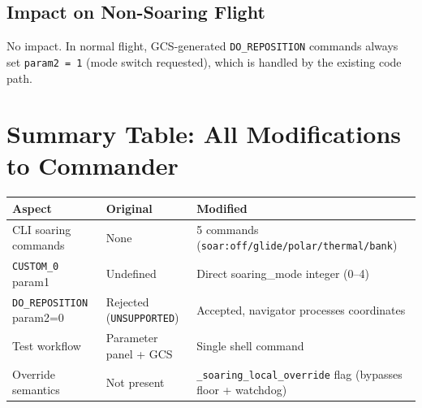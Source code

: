 \documentclass[12pt,a4paper]{article}
\begin{document}
\subsection{Impact on Non-Soaring Flight}

No impact. In normal flight, GCS-generated \texttt{DO\_REPOSITION} commands
always set \texttt{param2 = 1} (mode switch requested), which is handled
by the existing code path.

\section{Summary Table: All Modifications to Commander}

\begin{center}\begin{tabular}{p{3.5cm}p{4.5cm}p{5cm}}\toprule
Aspect & Original & Modified \\\midrule
CLI soaring commands & None & 5 commands (\texttt{soar:off/glide/polar/thermal/bank}) \\
\texttt{CUSTOM\_0} param1 & Undefined & Direct soaring\_mode integer (0--4) \\
\texttt{DO\_REPOSITION} param2=0 & Rejected (\texttt{UNSUPPORTED}) & Accepted, navigator processes coordinates \\
Test workflow & Parameter panel + GCS & Single shell command \\
Override semantics & Not present & \texttt{\_soaring\_local\_override} flag (bypasses floor + watchdog) \\
\bottomrule\end{tabular}\end{center}
\end{document}
